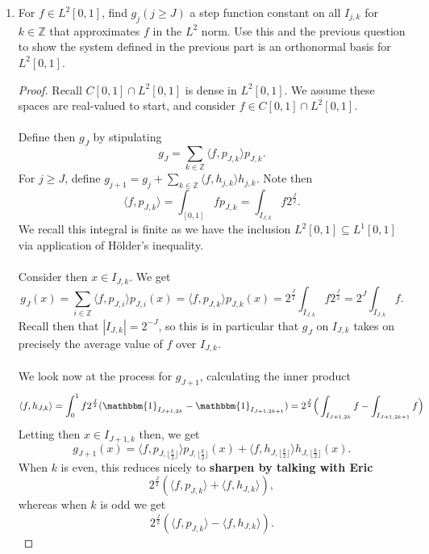 \documentclass[12pt]{article}
\newenvironment{ex}[2][Exercise]{\begin{trivlist}
\item[\hskip \labelsep {\bfseries #1}\hskip \labelsep {\bfseries #2.}]}{\end{trivlist}}
\begin{document}
\begin{ex}{14}
\begin{enumerate}
\begin{proof}
        \end{proof}
        \item For $f \in L^2[0,1]$, find $g_j (j \geq J)$ a step function constant on all $I_{j,k}$ for $k \in \mathbb{Z}$ that approximates $f$ in the $L^2$ norm. Use this and the previous question to show the system defined in the previous part is an orthonormal basis for $L^2[0,1]$.
        \begin{proof}
            Recall $C[0,1] \cap L^2[0,1]$ is dense in $L^2[0,1]$. We assume these spaces are real-valued to start, and consider $f \in C[0,1] \cap L^2[0,1]$. \\ \\
            Define then $g_J$ by stipulating 
            $$g_J = \sum_{k \in \mathbb{Z}} \langle f, p_{J,k} \rangle p_{J,k}.$$
            For $j \geq J$, define $g_{j + 1} = g_j + \sum_{k \in \mathbb{Z}} \langle f, h_{j,k}\rangle h_{j,k}$. Note then 
            $$\langle f, p_{J,k} \rangle = \int_{[0,1]} fp_{J,k} = \int_{I_{J, k}} f2^{\frac{J}{2}}.$$
            We recall this integral is finite as we have the inclusion $L^2[0,1] \subseteq L^1[0,1]$ via application of H\"older's inequality. \\ \\
            Consider then $x \in I_{J,k}$. We get 
            $$g_J(x) = \sum_{i \in \mathbb{Z}} \langle f, p_{J,i} \rangle p_{J,i}(x) = \langle f, p_{J,k} \rangle p_{J,k}(x) = 2^{\frac{J}{2}}\int_{I_{J, k}} f2^{\frac{J}{2}} = 2^J \int_{I_{J,k}} f.$$
            Recall then that $|I_{J,k}| = 2^{-J}$, so this is in particular that $g_J$ on $I_{J,k}$ takes on precisely the average value of $f$ over $I_{J,k}$. \\ \\
            We look now at the process for $g_{J + 1}$, calculating the inner product 
            $$\langle f, h_{J,k} \rangle = \int_0^1 f2^{\frac{J}{2}}(\mathbbm{1}_{I_{J + 1, 2k}} - \mathbbm{1}_{I_{J + 1, 2k + 1}}) = 2^{\frac{J}{2}} \Big ( \int_{I_{J + 1, 2k}} f - \int_{I_{J + 1, 2k + 1}} f \Big)$$
            Letting then $x \in I_{J + 1,k}$ then, we get 
            $$g_{J + 1}(x) = \langle f, p_{J, \lfloor \frac{k}{2} \rfloor}\rangle p_{J, \lfloor \frac{k}{2} \rfloor}(x) + \langle f, h_{J, \lfloor \frac{k}{2} \rfloor}\rangle h_{J, \lfloor \frac{k}{2} \rfloor}(x).$$
            When $k$ is even, this reduces nicely to \textbf{sharpen by talking with Eric}
            $$2^{\frac{J}{2}}(\langle f, p_{J,k} \rangle + \langle f, h_{J,k} \rangle),$$
            whereas when $k$ is odd we get
            $$2^{\frac{J}{2}}(\langle f, p_{J,k} \rangle - \langle f, h_{J,k} \rangle).$$

\end{proof}
\end{enumerate}
\end{ex}
\end{document}
